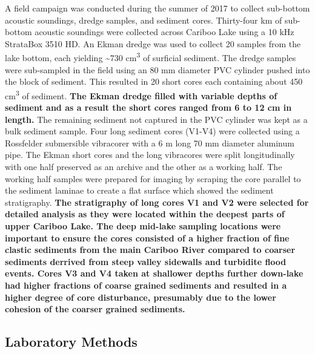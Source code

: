 \documentclass[Royal,times,doublespace,sageh]{sagej}
\begin{document}
A field campaign was conducted during the summer of 2017 to collect
sub-bottom acoustic soundings, dredge samples, and sediment cores.
Thirty-four km of sub-bottom acoustic soundings were collected across
Cariboo Lake using a 10 kHz StrataBox 3510 HD. An Ekman dredge was used
to collect 20 samples from the lake bottom, each yielding
\textasciitilde730 cm\textsuperscript{3} of surficial sediment. The
dredge samples were sub-sampled in the field using an 80 mm diameter PVC
cylinder pushed into the block of sediment. This resulted in 20 short
cores each containing about 450 cm\textsuperscript{3} of sediment.
\textbf{The Ekman dredge filled with variable depths of sediment and as
a result the short cores ranged from 6 to 12 cm in length.} The
remaining sediment not captured in the PVC cylinder was kept as a bulk
sediment sample. Four long sediment cores (V1-V4) were collected using a
Rossfelder submersible vibracorer with a 6 m long 70 mm diameter
aluminum pipe. The Ekman short cores and the long vibracores were split
longitudinally with one half preserved as an archive and the other as a
working half. The working half samples were prepared for imaging by
scraping the core parallel to the sediment laminae to create a flat
surface which showed the sediment stratigraphy. \textbf{The stratigraphy
of long cores V1 and V2 were selected for detailed analysis as they were
located within the deepest parts of upper Cariboo Lake. The deep
mid-lake sampling locations were important to ensure the cores consisted
of a higher fraction of fine clastic sediments from the main Cariboo
River compared to coarser sediments derrived from steep valley sidewalls
and turbidite flood events. Cores V3 and V4 taken at shallower depths
further down-lake had higher fractions of coarse grained sediments and
resulted in a higher degree of core disturbance, presumably due to the
lower cohesion of the coarser grained sediments.}

\hypertarget{laboratory-methods}{%
\subsection{Laboratory Methods}\label{laboratory-methods}}
\end{document}

